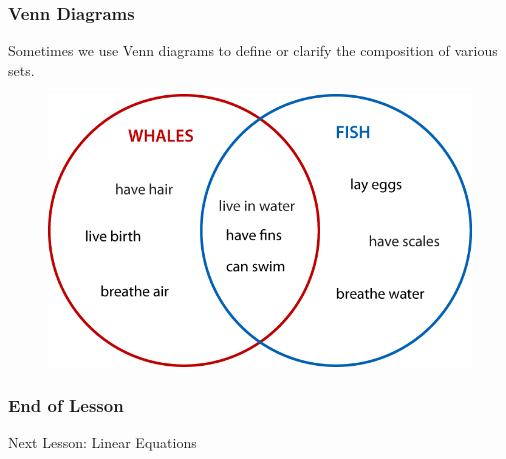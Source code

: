 \documentclass[xcolor=dvipsnames]{beamer}
\begin{document}
\begin{frame}
  \frametitle{Venn Diagrams}
  Sometimes we use Venn diagrams to define or clarify the composition
  of various sets.
  \begin{figure}[h]
    \includegraphics[scale=0.7]{./animals-01.png}
  \end{figure}
\end{frame}

\begin{frame}
  \frametitle{End of Lesson}
Next Lesson: Linear Equations
\end{frame}
\end{document}
